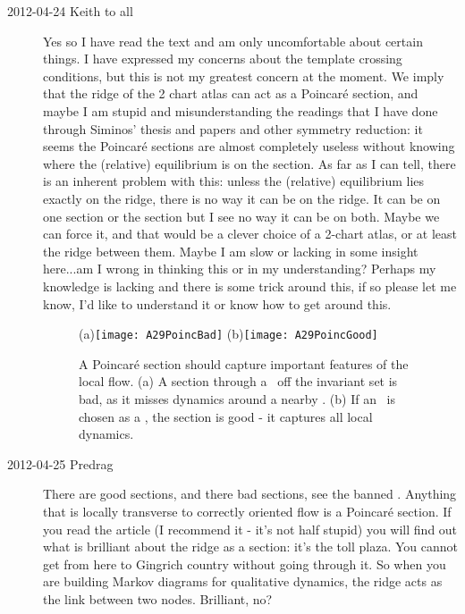 \begin{description}
\item[2012-04-24 Keith to all]  Yes so I have read the text and am only
uncomfortable about certain things.  I have expressed my concerns about
the template crossing conditions, but this is not my greatest concern at
the moment.  We imply that the ridge of the 2 chart atlas can act as a
Poincar\'e section, and maybe I am stupid and misunderstanding the
readings that I have done through Siminos' thesis and papers and other
symmetry reduction: it seems the Poincar\'e sections are almost
completely useless without knowing where the (relative) equilibrium is on
the section.  As far as I can tell, there is an inherent problem with
this: unless the (relative) equilibrium lies exactly on the ridge, there
is no way it can be on the ridge.  It can be on one section or the
section but I see no way it can be on both.  Maybe we can force it, and
that would be a clever choice of a 2-chart atlas, or at least the ridge
between them.  Maybe I am slow or lacking in some insight here...am I
wrong in thinking this or in my understanding?  Perhaps my knowledge is
lacking and there is some trick around this, if so please let me know,
I'd like to understand it or know how to get around this.

\begin{figure}
   \centering
(a)\texttt{[image: A29PoincBad]}
(b)\texttt{[image: A29PoincGood]}
   \caption{\label{fig:A29PoincBad}
A Poincar\'e section should capture important features of the local flow.
    (a)
A section through a \template\ off the invariant set is bad, as it misses
dynamics around a nearby \eqv.
    (b)
If an \eqv\ is chosen as a \template, the section is good - it captures
all local dynamics.
}
\end{figure}


\item[2012-04-25 Predrag] There are good sections, and there bad
sections, see the banned . Anything that is
locally transverse to correctly oriented flow is a Poincar\'e section. If
you read the article (I recommend it - it's not half stupid) you will
find out what is brilliant about the ridge as a section: it's the toll
plaza. You cannot get from here to Gingrich country without going through
it. So when you are building Markov diagrams for qualitative dynamics,
the ridge acts as the link between two nodes. Brilliant, no?


\end{description}
